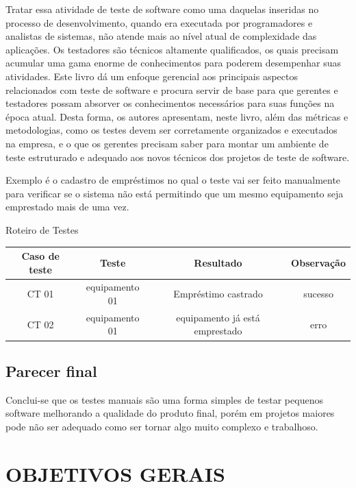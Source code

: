 \documentclass[
12pt,				%
oneside,			%
a4paper,			%
section=TITLE,
brazil,				%
]{abntex2}
\let\oldsection\section
\renewcommand\section{\clearpage\oldsection}
\begin{document}
  \begin{citacao}
    Tratar essa atividade de teste de software como uma daquelas inseridas no
    processo de desenvolvimento, quando era executada por programadores e
    analistas de sistemas, não atende mais ao nível atual de complexidade das
    aplicações. Os testadores são técnicos altamente qualificados, os quais
    precisam acumular uma gama enorme de conhecimentos para poderem desempenhar
    suas atividades. Este livro dá um enfoque gerencial aos principais aspectos
    relacionados com teste de software e procura servir de base para que gerentes
    e testadores possam absorver os conhecimentos necessários para suas funções
    na época atual. Desta forma, os autores apresentam, neste livro, além das
    métricas e metodologias, como os testes devem ser corretamente organizados e
    executados na empresa, e o que os gerentes precisam saber para montar um
    ambiente de teste estruturado e adequado aos novos técnicos dos projetos de
    teste de software.\cite[sipnose]{rios2013teste}
  \end{citacao}

  Exemplo é o cadastro de empréstimos no qual o teste vai ser feito manualmente
  para verificar se o sistema não está permitindo que um mesmo equipamento seja
  emprestado mais de uma vez.

\begin{quadro}[htb]
\caption{\label{quadro_exemplo}Roteiro de Testes}
\begin{tabular}{|c|c|c|c|}
  \hline
  \textbf{Caso de teste} & \textbf{Teste} & \textbf{Resultado} & \textbf{Observação} \\ \hline
  CT 01 & equipamento 01    & Empréstimo castrado& sucesso\\ \hline
  CT 02 & equipamento 01    & equipamento já está emprestado & erro \\ \hline
\end{tabular}
\end{quadro}

  \subsection{Parecer final}

  Conclui-se que os testes manuais são uma forma simples de testar pequenos
  software melhorando a qualidade do produto final, porém em projetos maiores
  pode não ser adequado como ser tornar algo muito complexo e trabalhoso.

  \section{OBJETIVOS GERAIS}
\end{document}
